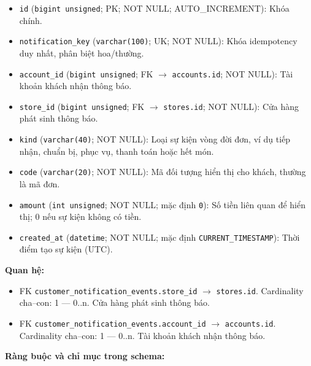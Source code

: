 \begin{itemize}

\item \texttt{id} (\texttt{bigint unsigned}; PK; NOT NULL; AUTO_INCREMENT): Khóa chính.

\item \texttt{notification\_key} (\texttt{varchar(100)}; UK; NOT NULL): Khóa idempotency duy nhất, phân biệt hoa/thường.

\item \texttt{account\_id} (\texttt{bigint unsigned}; FK $\rightarrow$ \texttt{accounts.id}; NOT NULL): Tài khoản khách nhận thông báo.

\item \texttt{store\_id} (\texttt{bigint unsigned}; FK $\rightarrow$ \texttt{stores.id}; NOT NULL): Cửa hàng phát sinh thông báo.

\item \texttt{kind} (\texttt{varchar(40)}; NOT NULL): Loại sự kiện vòng đời đơn, ví dụ tiếp nhận, chuẩn bị, phục vụ, thanh toán hoặc hết món.

\item \texttt{code} (\texttt{varchar(20)}; NOT NULL): Mã đối tượng hiển thị cho khách, thường là mã đơn.

\item \texttt{amount} (\texttt{int unsigned}; NOT NULL; mặc định \texttt{0}): Số tiền liên quan để hiển thị; 0 nếu sự kiện không có tiền.

\item \texttt{created\_at} (\texttt{datetime}; NOT NULL; mặc định \texttt{CURRENT\_TIMESTAMP}): Thời điểm tạo sự kiện (UTC).

\end{itemize}

\textbf{Quan hệ:}

\begin{itemize}

\item FK \texttt{customer\_notification\_events.store\_id} $\rightarrow$ \texttt{stores.id}. Cardinality cha--con: 1 — 0..n. Cửa hàng phát sinh thông báo.

\item FK \texttt{customer\_notification\_events.account\_id} $\rightarrow$ \texttt{accounts.id}. Cardinality cha--con: 1 — 0..n. Tài khoản khách nhận thông báo.

\end{itemize}

\textbf{Ràng buộc và chỉ mục trong schema:}

